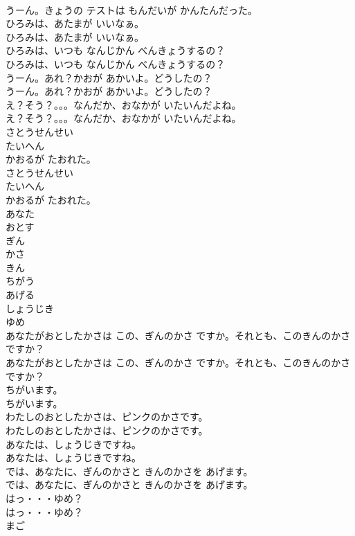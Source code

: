 \documentclass[8pt]{extreport}
\begin{document}
\begin{CJK}{UTF8}{min}
\\	うーん。きょうの テストは もんだいが かんたんだった。
\\	ひろみは、あたまが いいなぁ。
\\	ひろみは、あたまが いいなぁ。
\\	ひろみは、いつも なんじかん べんきょうするの？
\\	ひろみは、いつも なんじかん べんきょうするの？
\\	うーん。あれ？かおが あかいよ。どうしたの？
\\	うーん。あれ？かおが あかいよ。どうしたの？
\\	え？そう？。。。なんだか、おなかが いたいんだよね。
\\	え？そう？。。。なんだか、おなかが いたいんだよね。
\\	さとうせんせい
\\	たいへん
\\	かおるが たおれた。
\\	さとうせんせい
\\	たいへん
\\	かおるが たおれた。
\\	あなた
\\	おとす
\\	ぎん
\\	かさ
\\	きん
\\	ちがう
\\	あげる
\\	しょうじき
\\	ゆめ
\\	あなたがおとしたかさは この、ぎんのかさ ですか。それとも、このきんのかさ ですか？
\\	あなたがおとしたかさは この、ぎんのかさ ですか。それとも、このきんのかさ ですか？
\\	ちがいます。
\\	ちがいます。
\\	わたしのおとしたかさは、ピンクのかさです。
\\	わたしのおとしたかさは、ピンクのかさです。
\\	あなたは、しょうじきですね。
\\	あなたは、しょうじきですね。
\\	では、あなたに、ぎんのかさと  きんのかさを  あげます。
\\	では、あなたに、ぎんのかさと  きんのかさを  あげます。
\\	はっ・・・ゆめ？
\\	はっ・・・ゆめ？
\\	まご

\end{CJK}
\end{document}
